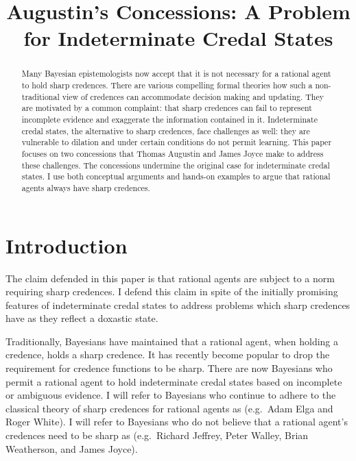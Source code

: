 \documentclass[11pt]{article}
\begin{document}

\title{Augustin's Concessions: A Problem for Indeterminate Credal States}
\author{}
\date{}
\maketitle

\begin{abstract} 
  {\noindent}Many Bayesian epistemologists now accept that it is not
  necessary for a rational agent to hold sharp credences. There are
  various compelling formal theories how such a non-traditional view
  of credences can accommodate decision making and updating. They are
  motivated by a common complaint: that sharp credences can fail to
  represent incomplete evidence and exaggerate the information
  contained in it. Indeterminate credal states, the alternative to
  sharp credences, face challenges as well: they are vulnerable to
  dilation and under certain conditions do not permit learning. This
  paper focuses on two concessions that Thomas Augustin and James
  Joyce make to address these challenges. The concessions undermine
  the original case for indeterminate credal states. I use both
  conceptual arguments and hands-on examples to argue that rational
  agents always have sharp credences.
\end{abstract}

\section{Introduction}
\label{Introduction}

The claim defended in this paper is that rational agents are subject
to a norm requiring sharp credences. I defend this claim in spite of
the initially promising features of indeterminate credal states to
address problems which sharp credences have as they reflect a doxastic
state.

Traditionally, Bayesians have maintained that a rational agent, when
holding a credence, holds a sharp credence. It has recently become
popular to drop the requirement for credence functions to be sharp.
There are now Bayesians who permit a rational agent to hold
indeterminate credal states based on incomplete or ambiguous evidence.
I will refer to Bayesians who continue to adhere to the classical
theory of sharp credences for rational agents as 
(e.g.\ Adam Elga and Roger White). I will refer to Bayesians who do
not believe that a rational agent's credences need to be sharp as
 (e.g.\ Richard Jeffrey, Peter Walley, Brian
Weatherson, and James Joyce).
\end{document}
